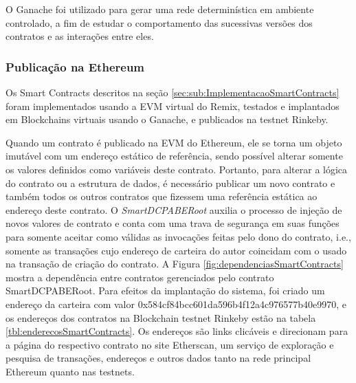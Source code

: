 \documentclass[a4paper,11pt]{article}
\begin{document}
O Ganache foi utilizado para gerar uma rede determinística em ambiente controlado, a fim de estudar o comportamento das sucessivas versões dos contratos e as interações entre eles. %

\subsubsection{Publicação na Ethereum}


Os Smart Contracts descritos na seção \ref{sec:sub:ImplementacaoSmartContracts} foram implementados usando a EVM virtual do Remix, testados e implantados em Blockchains virtuais usando o Ganache, e  publicados na testnet Rinkeby.

Quando um contrato é publicado na EVM do Ethereum, ele se torna um objeto imutável com um endereço  estático de referência, sendo possível alterar somente os valores definidos como variáveis deste contrato.
Portanto, para alterar a lógica do contrato ou a estrutura de dados, é necessário publicar um novo contrato e também todos os outros contratos que fizessem uma referência estática ao endereço deste contrato.
O \emph{SmartDCPABERoot} auxilia o processo de injeção de novos valores de contrato e conta com uma trava de segurança em suas funções para somente aceitar como válidas as invocações feitas pelo dono do contrato, i.e., somente as transações cujo  endereço de carteira do autor coincidam com o usado na transação de criação do contrato.
A Figura \ref{fig:dependenciasSmartContracts} mostra a dependência entre contratos gerenciados pelo contrato SmartDCPABERoot. %
Para efeitos da implantação do sistema, foi criado um endereço da carteira com valor 0x584cf84bcc601da596b4f12a4c976577b40e9970, e os endereços dos contratos na Blockchain testnet Rinkeby estão na tabela \ref{tbl:enderecosSmartContracts}. %
Os endereços são links clicáveis e direcionam para a página do respectivo contrato no site Etherscan, um serviço de exploração e pesquisa de transações, endereços e outros dados tanto na rede principal Ethereum quanto nas testnets.
\end{document}
